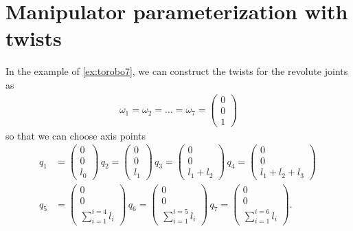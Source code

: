 \section{Manipulator parameterization with twists}
%
In the example of \autoref{ex:torobo7}, we can construct the twists for the revolute joints as 
%
\begin{align}
	\omega_1 = \omega_2 = \ldots = \omega_7 = \left(\begin{array}{c}
	0 \\ 0 \\ 1
	\end{array}\right)
\end{align}
%
so that we can choose axis points 
%
\begin{align}
	q_1 &= \left(\begin{array}{c}
	0 \\ 0 \\ l_0
	\end{array}\right) \, 
	q_2 = \left(\begin{array}{c}
	0 \\ 0 \\ l_1
	\end{array}\right) \, 
	q_3 = \left(\begin{array}{c}
	0 \\ 0 \\ l_1 + l_2
	\end{array}\right) \, 
	q_4 = \left(\begin{array}{c}
	0 \\ 0 \\ l_1 + l_2 + l_3
	\end{array}\right) \, 
	\\
	q_5 &= \left(\begin{array}{c}
	0 \\ 0 \\  \sum_{i=1}^{i=4} l_i
	\end{array}\right) \, 
	q_6 = \left(\begin{array}{c}
	0 \\ 0 \\  \sum_{i=1}^{i=5} l_i
	\end{array}\right) \, 
	q_7 = \left(\begin{array}{c}
	0 \\ 0 \\  \sum_{i=1}^{i=6} l_i
	\end{array}\right).
\end{align}

